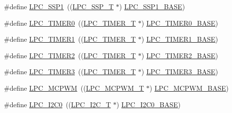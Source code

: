\begin{DoxyCompactItemize}
\#define \hyperlink{group__PERIPH__175X__6X__BASE_ga09c4610ada1d9aa18913963cbd1a6e52}{L\-P\-C\-\_\-\-S\-S\-P1}~((\hyperlink{structLPC__SSP__T}{L\-P\-C\-\_\-\-S\-S\-P\-\_\-\-T}              $\ast$) \hyperlink{group__PERIPH__407X__8X__BASE_ga05d118997f53f596d3a087f8b91a1969}{L\-P\-C\-\_\-\-S\-S\-P1\-\_\-\-B\-A\-S\-E})
\item 
\#define \hyperlink{group__PERIPH__175X__6X__BASE_ga800f32a8a38d9e9c8f3b6ab161f6f2d2}{L\-P\-C\-\_\-\-T\-I\-M\-E\-R0}~((\hyperlink{structLPC__TIMER__T}{L\-P\-C\-\_\-\-T\-I\-M\-E\-R\-\_\-\-T}            $\ast$) \hyperlink{group__PERIPH__407X__8X__BASE_ga58d2cc2a6a4bd9319853ad5b62a20d43}{L\-P\-C\-\_\-\-T\-I\-M\-E\-R0\-\_\-\-B\-A\-S\-E})
\item 
\#define \hyperlink{group__PERIPH__175X__6X__BASE_ga0d28200f11e877cece24025ebe7fe72a}{L\-P\-C\-\_\-\-T\-I\-M\-E\-R1}~((\hyperlink{structLPC__TIMER__T}{L\-P\-C\-\_\-\-T\-I\-M\-E\-R\-\_\-\-T}            $\ast$) \hyperlink{group__PERIPH__407X__8X__BASE_ga077e94a95d95d79f6aeb0ea962377c46}{L\-P\-C\-\_\-\-T\-I\-M\-E\-R1\-\_\-\-B\-A\-S\-E})
\item 
\#define \hyperlink{group__PERIPH__175X__6X__BASE_gae0a3c421e7e1ac3ffd7e740e33387dc5}{L\-P\-C\-\_\-\-T\-I\-M\-E\-R2}~((\hyperlink{structLPC__TIMER__T}{L\-P\-C\-\_\-\-T\-I\-M\-E\-R\-\_\-\-T}            $\ast$) \hyperlink{group__PERIPH__407X__8X__BASE_gab46122134a159b494e060ae3a7be0967}{L\-P\-C\-\_\-\-T\-I\-M\-E\-R2\-\_\-\-B\-A\-S\-E})
\item 
\#define \hyperlink{group__PERIPH__175X__6X__BASE_gab34ae64ea250497b5148b7ffb61d04f5}{L\-P\-C\-\_\-\-T\-I\-M\-E\-R3}~((\hyperlink{structLPC__TIMER__T}{L\-P\-C\-\_\-\-T\-I\-M\-E\-R\-\_\-\-T}            $\ast$) \hyperlink{group__PERIPH__407X__8X__BASE_ga002e95d51eef32473052ea2575440eac}{L\-P\-C\-\_\-\-T\-I\-M\-E\-R3\-\_\-\-B\-A\-S\-E})
\item 
\#define \hyperlink{group__PERIPH__175X__6X__BASE_ga6fe8e415821195a786b3f0dc5e7fc9fa}{L\-P\-C\-\_\-\-M\-C\-P\-W\-M}~((\hyperlink{structLPC__MCPWM__T}{L\-P\-C\-\_\-\-M\-C\-P\-W\-M\-\_\-\-T}            $\ast$) \hyperlink{group__PERIPH__407X__8X__BASE_gad8a41dc802e3ea0ba9457d42a6927c03}{L\-P\-C\-\_\-\-M\-C\-P\-W\-M\-\_\-\-B\-A\-S\-E})
\item 
\#define \hyperlink{group__PERIPH__175X__6X__BASE_ga14b6c56857e970a682a9bb22a0cb6716}{L\-P\-C\-\_\-\-I2\-C0}~((\hyperlink{structLPC__I2C__T}{L\-P\-C\-\_\-\-I2\-C\-\_\-\-T}              $\ast$) \hyperlink{group__PERIPH__407X__8X__BASE_gab4476c9e874621194369f74fcf26ce92}{L\-P\-C\-\_\-\-I2\-C0\-\_\-\-B\-A\-S\-E})
\item 

\end{DoxyCompactItemize}
